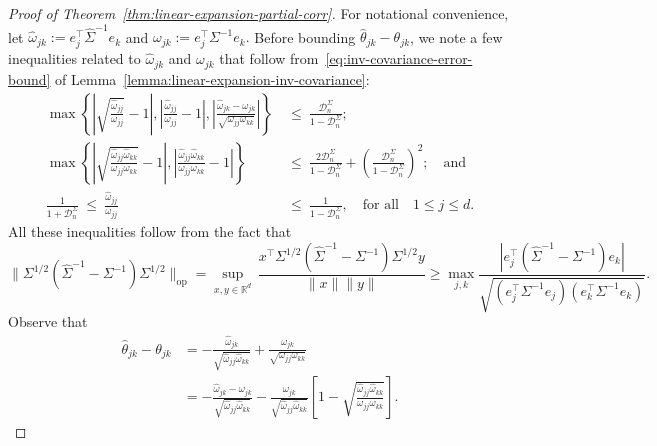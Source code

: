 \documentclass[11pt]{article}
\begin{document}
\begin{appendices}
\begin{proof}[Proof of Theorem~\ref{thm:linear-expansion-partial-corr}]
For notational convenience, let
$\widehat{\omega}_{jk} := e_j^{\top}\widehat{\Sigma}^{-1}e_k$ and $\omega_{jk} := e_j^{\top}\Sigma^{-1}e_k.$
Before bounding $\widehat{\theta}_{jk} - \theta_{jk}$, we note a few inequalities related to $\widehat{\omega}_{jk}$ and $\omega_{jk}$ that follow from~\eqref{eq:inv-covariance-error-bound} of Lemma~\ref{lemma:linear-expansion-inv-covariance}:
\begin{equation}\label{eq:inequalities-omegas}
\begin{split}
\max\left\{\left|\sqrt{\frac{\widehat{\omega}_{jj}}{\omega_{jj}}} - 1\right|, \left|\frac{\widehat{\omega}_{jj}}{\omega_{jj}} - 1\right|, \left|\frac{\widehat{\omega}_{jk} - \omega_{jk}}{\sqrt{\omega_{jj}\omega_{kk}}}\right|\right\} ~&\le~ \frac{\mathcal{D}_n^{\Sigma}}{1 - \mathcal{D}_n^{\Sigma}};\\
\max\left\{\left|\sqrt{\frac{\widehat{\omega}_{jj}\widehat{\omega}_{kk}}{\omega_{jj}\omega_{kk}}} - 1\right|, \left|\frac{\widehat{\omega}_{jj}\widehat{\omega}_{kk}}{\omega_{jj}\omega_{kk}} - 1\right|\right\} ~&\le~ \frac{2\mathcal{D}_n^{\Sigma}}{1 - \mathcal{D}_n^{\Sigma}} + \left(\frac{\mathcal{D}_n^{\Sigma}}{1 - \mathcal{D}_n^{\Sigma}}\right)^2;\quad\mbox{and}\\
\frac{1}{1 + \mathcal{D}_n^{\Sigma}} ~\le~ \frac{\widehat{\omega}_{jj}}{\omega_{jj}} ~&\le~ \frac{1}{1 - \mathcal{D}_n^{\Sigma}},\quad\mbox{for all}\quad 1\le j\le d.
\end{split}
\end{equation}
All these inequalities follow from the fact that
\[
\|\Sigma^{1/2}(\widehat{\Sigma}^{-1} - \Sigma^{-1})\Sigma^{1/2}\|_{\mathrm{op}} = \sup_{x, y\in\mathbb{R}^d}\,\frac{x^{\top}\Sigma^{1/2}(\widehat{\Sigma}^{-1} - \Sigma^{-1})\Sigma^{1/2}y}{\|x\|\|y\|} \ge \max_{j,k}\frac{|e_j^{\top}(\widehat{\Sigma}^{-1} - \Sigma^{-1})e_k|}{\sqrt{(e_j^{\top}\Sigma^{-1}e_j)(e_k^{\top}\Sigma^{-1}e_k)}}.
\]
Observe that
\begin{align*}
\widehat{\theta}_{jk} - \theta_{jk} &= -\frac{\widehat{\omega}_{jk}}{\sqrt{\widehat{\omega}_{jj}\widehat{\omega}_{kk}}} + \frac{\omega_{jk}}{\sqrt{\omega_{jj}\omega_{kk}}}\\
&= -\frac{\widehat{\omega}_{jk} - \omega_{jk}}{\sqrt{\widehat{\omega}_{jj}\widehat{\omega}_{kk}}} - \frac{\omega_{jk}}{\sqrt{\widehat{\omega}_{jj}\widehat{\omega}_{kk}}}\left[1 - \sqrt{\frac{\widehat{\omega}_{jj}\widehat{\omega}_{kk}}{\omega_{jj}\omega_{kk}}}\right].

\end{align*}
\end{proof}
\end{appendices}
\end{document}
